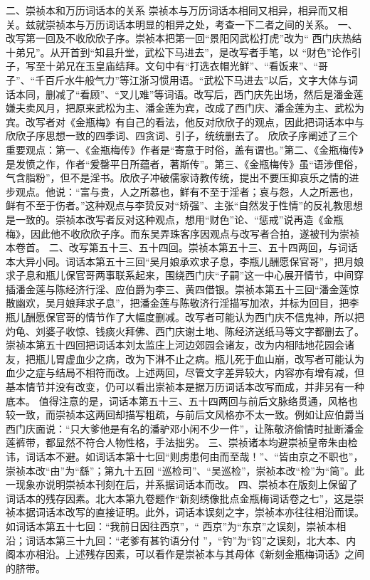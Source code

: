 \documentclass[a4paper,12pt,UTF8,twoside]{ctexbook}
\begin{document}
二、崇祯本和万历词话本的关系
崇祯本与万历词话本相同又相异，相异而又相关。兹就崇祯本与万历词话本明显的相异之处，考查一下二者之间的关系。
一、改写第一回及不收欣欣子序。崇祯本把第一回“景阳冈武松打虎”改为“ 西门庆热结十弟兄”。从开首到“知县升堂，武松下马进去”，是改写者手笔，以 “财色”论作引子，写至十弟兄在玉皇庙结拜。文句中有“打选衣帽光鲜”、“看饭来”、“哥子”、“千百斤水牛般气力”等江浙习惯用语。“武松下马进去”以后，文字大体与词话本同，删减了“看顾”、“叉儿难”等词语。改写后，西门庆先出场，然后是潘金莲嫌夫卖风月，把原来武松为主、潘金莲为宾，改成了西门庆、潘金莲为主、武松为宾。改写者对《金瓶梅》有自己的看法，他反对欣欣子的观点，因此把词话本中与欣欣子序思想一致的四季词、四贪词、引子，统统删去了。
欣欣子序阐述了三个重要观点：第一、《金瓶梅传》作者是“寄意于时俗，盖有谓也。”第二、《金瓶梅传》是发愤之作，作者“爰罄平日所蕴者，著斯传”。第三、《金瓶梅传》虽“语涉俚俗，气含脂粉”，但不是淫书。欣欣子冲破儒家诗教传统，提出不要压抑哀乐之情的进步观点。他说：“富与贵，人之所慕也，鲜有不至于淫者；哀与怨，人之所恶也，鲜有不至于伤者。”这种观点与李贽反对“矫强”、主张“自然发于性情”的反礼教思想是一致的。崇祯本改写者反对这种观点，想用“财色”论、“惩戒”说再造《金瓶梅》，因此他不收欣欣子序。而东吴弄珠客序因观点与改写者合拍，遂被刊为崇祯本卷首。
二、改写第五十三、五十四回。崇祯本第五十三、五十四两回，与词话本大异小同。词话本第五十三回“吴月娘承欢求子息，李瓶儿酬愿保官哥”，把月娘求子息和瓶儿保官哥两事联系起来，围绕西门庆“子嗣”这一中心展开情节，中间穿插潘金莲与陈经济行淫、应伯爵为李三、黄四借银。崇祯本第五十三回“潘金莲惊散幽欢，吴月娘拜求子息”，把潘金莲与陈敬济行淫描写加浓，并标为回目，把李瓶儿酬愿保官哥的情节作了大幅度删减。改写者可能认为西门庆不信鬼神，所以把灼龟、刘婆子收惊、钱痰火拜佛、西门庆谢土地、陈经济送纸马等文字都删去了。崇祯本第五十四回把词话本刘太监庄上河边郊园会诸友，改为内相陆地花园会诸友，把瓶儿胃虚血少之病，改为下淋不止之病。瓶儿死于血山崩，改写者可能认为血少之症与结局不相符而改。上述两回，尽管文字差异较大，内容亦有增有减，但基本情节并没有改变，仍可以看出崇祯本是据万历词话本改写而成，并非另有一种底本。
值得注意的是，词话本第五十三、五十四两回与前后文脉络贯通，风格也较一致，而崇祯本这两回却描写粗疏，与前后文风格亦不太一致。例如让应伯爵当西门庆面说：“只大爹他是有名的潘驴邓小闲不少一件”，让陈敬济偷情时扯断潘金莲裤带，都显然不符合人物性格，手法拙劣。
三、崇祯诸本均避崇祯皇帝朱由检讳，词话本不避。如词话本第十七回“则虏患何由而至哉！”、“皆由京之不职也”，崇祯本改“由”为“繇”；第九十五回 “巡检司”、“吴巡检”，崇祯本改“检”为“简”。此一现象亦说明崇祯本刊刻在后，并系据词话本而改。
四、崇祯本在版刻上保留了词话本的残存因素。北大本第九卷题作“新刻绣像批点金瓶梅词话卷之七”，这是崇祯本据词话本改写的直接证明。此外，词话本误刻之字，崇祯本亦往往相沿而误。如词话本第五十七回：“我前日因往西京”，“ 西京”为“东京”之误刻，崇祯本相沿；词话本第三十九回：“老爹有甚钓语分付 ”，“钓”为“钧”之误刻，北大本、内阁本亦相沿。上述残存因素，可以看作是崇祯本与其母体《新刻金瓶梅词话》之间的脐带。
\end{document}
